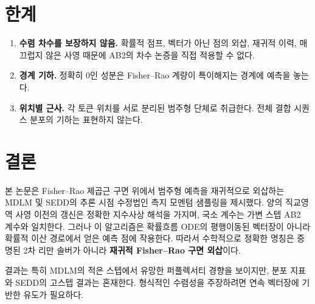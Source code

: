 \section{한계}

\begin{enumerate}
  \item \textbf{수렴 차수를 보장하지 않음.} 확률적 점프, 벡터가 아닌 점의 외삽, 재귀적 이력,
  매끄럽지 않은 사영 때문에 AB2의 차수 논증을 직접 적용할 수 없다.
  \item \textbf{경계 기하.} 정확히 0인 성분은 Fisher--Rao 계량이 특이해지는 경계에 예측을 놓는다.
  \item \textbf{위치별 근사.} 각 토큰 위치를 서로 분리된 범주형 단체로 취급한다. 전체 결합 시퀀스
  분포의 기하는 표현하지 않는다.
\end{enumerate}

\section{결론}

본 논문은 Fisher--Rao 제곱근 구면 위에서 범주형 예측을 재귀적으로 외삽하는 MDLM 및 SEDD의
추론 시점 수정법인 측지 모멘텀 샘플링을 제시했다. 양의 직교영역 사영 이전의 갱신은 정확한
지수사상 해석을 가지며, 국소 계수는 가변 스텝 AB2 계수와 일치한다. 그러나 이 알고리즘은
확률흐름 ODE의 평행이동된 벡터장이 아니라 확률적 이산 경로에서 얻은 예측 점에 작용한다. 따라서
수학적으로 정확한 명칭은 증명된 2차 리만 솔버가 아니라 \textbf{재귀적 Fisher--Rao 구면 외삽}이다.

결과는 특히 MDLM의 적은 스텝에서 유망한 퍼플렉서티 경향을 보이지만, 분포 지표와 SEDD의
고스텝 결과는 혼재한다. 형식적인 수렴성을 주장하려면 연속 벡터장에 기반한 유도가 필요하다.
